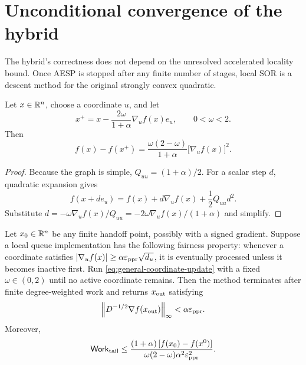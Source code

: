 \section{Unconditional convergence of the hybrid}
\label{sec:convergence}

The hybrid's correctness does not depend on the unresolved accelerated
locality bound.  Once AESP is stopped after any finite number of stages, local
SOR is a descent method for the original strongly convex quadratic.

\begin{lemma}
\label{lem:coordinate-decrease}
Let \(x\in\mathbb{R}^n\), choose a coordinate \(u\), and let
\begin{equation}
    x^+
    =x-\frac{2\omega}{1+\alpha}\nabla_u f(x)e_u,
    \qquad 0<\omega<2.
    \label{eq:general-coordinate-update}
\end{equation}
Then
\begin{equation}
    f(x)-f(x^+)
    =\frac{\omega(2-\omega)}{1+\alpha}\bigl[\nabla_u f(x)\bigr]^2.
    \label{eq:exact-coordinate-decrease}
\end{equation}
\end{lemma}

\begin{proof}
Because the graph is simple, \(Q_{uu}=(1+\alpha)/2\).  For a scalar step
\(d\), quadratic expansion gives
\[
    f(x+de_u)=f(x)+d\nabla_u f(x)+\frac12Q_{uu}d^2.
\]
Substitute
\(d=-\omega\nabla_u f(x)/Q_{uu}
=-2\omega\nabla_u f(x)/(1+\alpha)\) and simplify.
\end{proof}

\begin{theorem}
\label{thm:tail-convergence}
Let \(x_0\in\mathbb{R}^n\) be any finite handoff point, possibly with a signed
gradient.  Suppose a local queue implementation has the following fairness
property: whenever a coordinate satisfies
\(
\left\lvert \nabla_u f(x)\right\rvert\geq\alpha\varepsilon_{\mathrm{ppr}}\sqrt{d_u}
\), it is eventually processed unless it becomes inactive first.  Run
\cref{eq:general-coordinate-update} with a fixed \(\omega\in(0,2)\) until no
active coordinate remains.  Then the method terminates after finite
degree-weighted work and returns \(x_{\rm out}\) satisfying
\begin{equation}
    \left\lVert D^{-1/2}\nabla f(x_{\rm out})\right\rVert_\infty<\alpha\varepsilon_{\mathrm{ppr}}.
    \label{eq:tail-final-certificate}
\end{equation}
Moreover,
\begin{equation}
    \mathsf{Work}_{\rm tail}
    \leq
    \frac{(1+\alpha)\,[f(x_0)-f(x^0)]}
         {\omega(2-\omega)\alpha^2\varepsilon_{\mathrm{ppr}}^2}.
    \label{eq:general-tail-work}
\end{equation}
\end{theorem}

